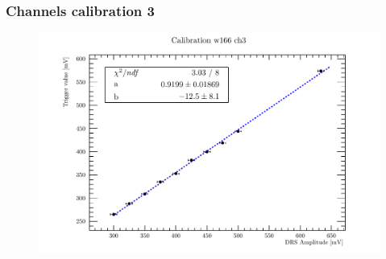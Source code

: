 
\begin{frame} [fragile]
\small
	\frametitle{Channels calibration 3}
    		\begin{figure}
		 \centering
			\includegraphics[scale=0.5]{figures/ch3.pdf}
		\end{figure}  
\end{frame}